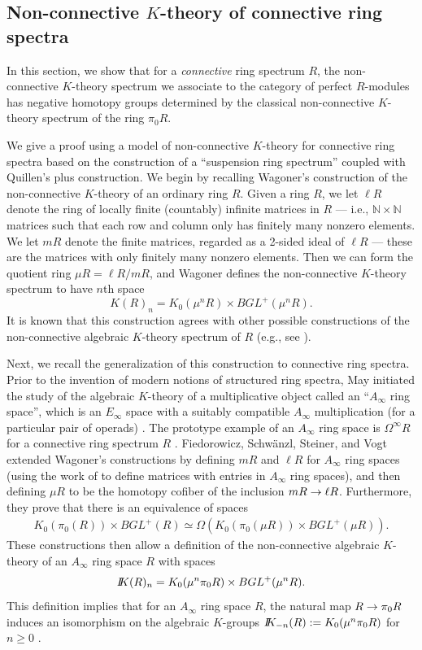 \documentclass{amsart}
\newcommand{\htp}{\simeq}
\renewcommand{\to}{\mathchoice{\longrightarrow}{\rightarrow}{\rightarrow}{\rightarrow}}
\newcommand{\bbK}{I\mspace{-6.mu}K}
\newcommand{\bN}{{\mathbb{N}}}
\numberwithin{equation}{section}
\theoremstyle{definition}
\begin{document}
\subsection{Non-connective $K$-theory of connective ring spectra}

In this section, we show that for a {\em connective} ring spectrum $R$, the
non-connective $K$-theory spectrum we associate to the category of
perfect $R$-modules has negative homotopy groups determined by the
classical non-connective $K$-theory spectrum of the ring $\pi_0 R$.

We give a proof using a model of non-connective $K$-theory
for connective ring spectra based on the construction of a
``suspension ring spectrum'' coupled with Quillen's plus construction.
We begin by recalling Wagoner's construction \cite{Wagoner} of the
non-connective $K$-theory of an ordinary ring $R$.  Given a ring $R$,
we let $\ell R$ denote the ring of locally finite (countably) infinite
matrices in $R$ --- i.e., $\bN \times \bN$ matrices such that each row
and column only has finitely many nonzero elements.  We let $mR$ denote the
finite matrices, regarded as a 2-sided ideal of $\ell R$ --- these are the
matrices with only finitely many nonzero elements.  Then we can form
the quotient ring $\mu R = \ell R / mR$, and Wagoner defines the
non-connective $K$-theory spectrum to have $n$th space
\[
K(R)_n = K_0(\mu^n R) \times BGL^+ (\mu^n R).
\]
It is known that this construction agrees with other possible
constructions of the non-connective algebraic $K$-theory spectrum of
$R$ (e.g., see \cite[\S 6]{PedersenWeibel}).

Next, we recall the generalization of this construction to connective
ring spectra.  Prior to the invention of modern notions of structured
ring spectra, May initiated the study of the algebraic $K$-theory of a
multiplicative object called an ``$A_\infty$ ring space'', which is an
$E_\infty$ space with a suitably compatible $A_\infty$ multiplication
(for a particular pair of operads) \cite{MayK, Steiner}.  The
prototype example of an $A_\infty$ ring space is $\Omega^\infty R$ for
a connective ring spectrum $R$ \cite[3.1]{MayK}.  Fiedorowicz,
Schw\"anzl, Steiner, and Vogt~\cite{noncondeloop} extended Wagoner's
constructions by defining $mR$ and $\ell R$ for $A_\infty$ ring
spaces (using the work of \cite{Steiner} to define matrices with
entries in $A_\infty$ ring spaces), and then defining $\mu R$ to be
the homotopy cofiber of the inclusion $mR \to \ell R$.  Furthermore,
they prove that there is an equivalence of spaces
\begin{eqnarray}\label{eqn:deloop}
K_0(\pi_0(R)) \times BGL^+(R) \htp \Omega(K_0(\pi_0(\mu R)) \times
BGL^+(\mu R)).
\end{eqnarray}
These constructions then allow a definition of the non-connective
algebraic $K$-theory of an $A_\infty$ ring space $R$ with spaces
\begin{eqnarray}\label{eqn:fssv}
\bbK(R)_n = K_0(\mu^n \pi_0 R) \times BGL^+ (\mu^n R).
\end{eqnarray}
This definition implies that for an $A_\infty$
ring space $R$, the natural map $R \to\pi_0 R$ induces an
isomorphism on the algebraic $K$-groups $\bbK_{-n}(R):=K_0(\mu^n\pi_0
R)$ for $n \geq 0$ \cite[1.1]{noncondeloop}.
\end{document}

